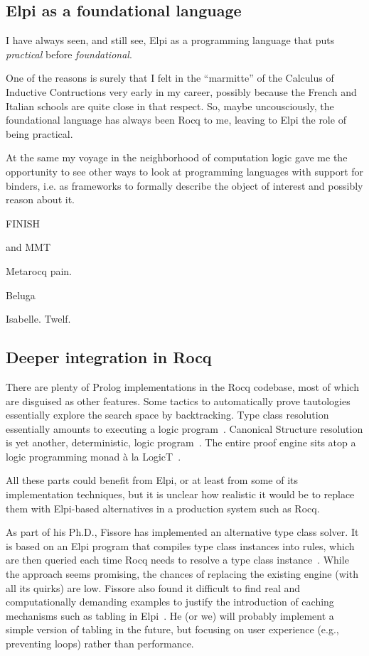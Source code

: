 \documentclass{these-ISSS}
\begin{document}
\subsection{Elpi as a foundational language}

I have always seen, and still see, Elpi as a programming language
that puts \emph{practical} before \emph{foundational}.

One of the reasons is surely
that I felt in the ``marmitte'' of the Calculus of
Inductive Contructions very early in my career, possibly because
the French and Italian schools are quite close in that respect.
So, maybe uncousciously, the foundational language has always
been Rocq to me, leaving to Elpi the role of being practical.

At the same my voyage in the neighborhood of computation logic
gave me the opportunity to see other ways to look at programming
languages with support for binders, i.e. as frameworks to formally
describe the object of interest and possibly reason about it.

FINISH

 and
MMT~\cite{RABE20131}


Metarocq pain.

Beluga\cite{DBLP:conf/cade/PientkaC15,10.1007/978-3-642-12251-4_1}

Isabelle.
 Twelf.


\subsection{Deeper integration in Rocq}

There are plenty of Prolog implementations in the Rocq codebase, most of
which are disguised as other features. Some tactics to automatically prove
tautologies essentially explore the search space by backtracking. Type class
resolution essentially amounts to executing a logic program~\cite{fctc}.
Canonical Structure resolution is yet another, deterministic, logic
program~\cite{tassi13}. The entire proof engine sits atop a logic programming
monad à la LogicT~\cite{logicT}.

All these parts could benefit from Elpi, or at least from some of its
implementation techniques, but it is unclear how realistic it would be to
replace them with Elpi-based alternatives in a production system such as Rocq.

As part of his Ph.D., Fissore has implemented an alternative type class solver.
It is based on an Elpi program that compiles type class instances into rules,
which are then queried each time Rocq needs to resolve a type class
instance~\cite{newtc,unifforfree}. While the approach seems promising, the
chances of replacing the existing engine (with all its quirks) are low. Fissore
also found it difficult to find real and computationally demanding examples to
justify the introduction of caching mechanisms such as tabling in
Elpi~\cite{selsam2020tabledtypeclassresolution,brigittePHD}. He (or we) will
probably implement a simple version of tabling in the future, but focusing on
user experience (e.g., preventing loops) rather than performance.
\end{document}
